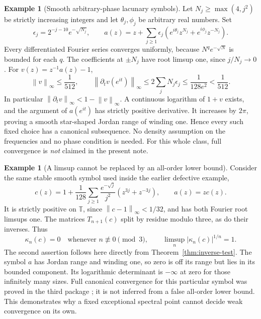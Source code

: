 \documentclass[11pt]{article}
\theoremstyle{definition}
\newtheorem{example}[theorem]{Example}
\newcommand{\T}{\mathbb T}
\newcommand{\norm}[1]{\left\lVert #1\right\rVert}
\begin{document}
\begin{example}[Smooth arbitrary-phase lacunary symbols]\label{ex:lacunary}
Let $N_j\ge\max(4,j^2)$ be strictly increasing integers and let $\theta_j,\phi_j$ be arbitrary real numbers. Set
\[
 \epsilon_j=2^{-j-10}e^{-\sqrt{N_j}},\qquad
 a(z)=z+\sum_{j\ge1}\epsilon_j
   (e^{i\theta_j}z^{N_j}+e^{i\phi_j}z^{-N_j}).
\]
Every differentiated Fourier series converges uniformly, because $N^q e^{-\sqrt N}$ is bounded for each $q$. The coefficients at $\pm N_j$ have root limsup one, since $j/N_j\to0$. For $v(z)=z^{-1}a(z)-1$,
\[
 \norm v_\infty\le\frac1{512},\qquad
 \norm{\partial_t v(e^{it})}_\infty
 \le2\sum_jN_j\epsilon_j\le\frac1{128e^2}<\frac1{512}.
\]
In particular $\norm{\partial_t v}_\infty<1-\norm v_\infty$. A continuous logarithm of $1+v$ exists, and the argument of $a(e^{it})$ has strictly positive derivative. It increases by $2\pi$, proving a smooth star-shaped Jordan range of winding one. Hence every such fixed choice has a canonical subsequence. No density assumption on the frequencies and no phase condition is needed. For this whole class, full convergence is \emph{not} claimed in the present note.
\end{example}

\begin{example}[A limsup cannot be replaced by an all-order lower bound]\label{ex:zeros}
Consider the same stable smooth symbol used inside the earlier defective example,
\[
 c(z)=1+\frac1{128}\sum_{j\ge1}\frac{e^{-\sqrt j}}{j^2}(z^{3j}+z^{-3j}),
 \qquad a(z)=zc(z).
\]
It is strictly positive on $\T$, since $\norm{c-1}_\infty<1/32$, and has both Fourier root limsups one. The matrices $T_{n+1}(c)$ split by residue modulo three, as do their inverses. Thus
\begin{equation}
 \kappa_n(c)=0\quad\text{whenever }n\not\equiv0\pmod3,
 \qquad
 \limsup_n|\kappa_n(c)|^{1/n}=1.
 \label{eq:zero-warning}
\end{equation}
The second assertion follows here directly from Theorem~\ref{thm:inverse-test}. The symbol $a$ has Jordan range and winding one, so zero is off its range but lies in its bounded component. Its logarithmic determinant is $-\infty$ at zero for those infinitely many sizes. Full canonical convergence for this particular symbol was proved in the third package \cite{round3}; it is not inferred from a false all-order lower bound. This demonstrates why a fixed exceptional spectral point cannot decide weak convergence on its own.
\end{example}
\end{document}
